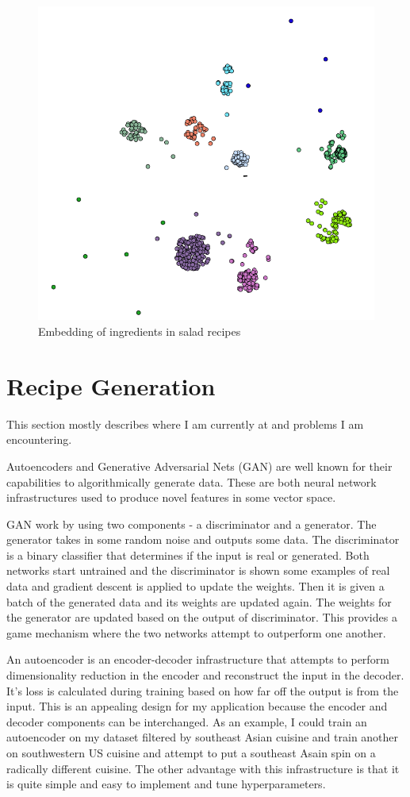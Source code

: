 \documentclass[conference]{IEEEtran}
\begin{document}
  \begin{figure}[h!]
	\centering
	\includegraphics[width=0.8\linewidth]{salads.png}
	\caption[Embedding of ingredients in salad recipes]{Embedding of ingredients in salad recipes}
	\label{fig:P2compileP0-1}
  \end{figure}

\section{Recipe Generation}
This section mostly describes where I am currently at and problems I am encountering.

Autoencoders \cite{Makhzani16} and Generative Adversarial Nets (GAN) \cite{Goodfellow14} are well known for their capabilities
to algorithmically generate data. These are both neural network infrastructures used to produce
novel features in some vector space.

GAN work by using two components - a discriminator and
a generator. The generator takes in some random noise and outputs some data. The discriminator
is a binary classifier that determines if the input is real or generated. Both networks start
untrained and the discriminator is shown some examples of real data and gradient descent is
applied to update the weights. Then it is given a batch of the generated data and its weights
are updated again. The weights for the generator are updated based on the output of discriminator.
This provides a game mechanism where the two networks attempt to outperform one another.

An autoencoder is an encoder-decoder infrastructure that attempts to perform dimensionality
reduction in the encoder and reconstruct the input in the decoder. It's loss is calculated
during training based on how far off the output is from the input. This is an appealing design
for my application because the encoder and decoder components can be interchanged. As an example,
I could train an autoencoder on my dataset filtered by southeast Asian cuisine and train another
on southwestern US cuisine and attempt to put a southeast Asain spin on a radically different
cuisine. The other advantage with this infrastructure is that it is quite simple and easy to
implement and tune hyperparameters.
\end{document}
